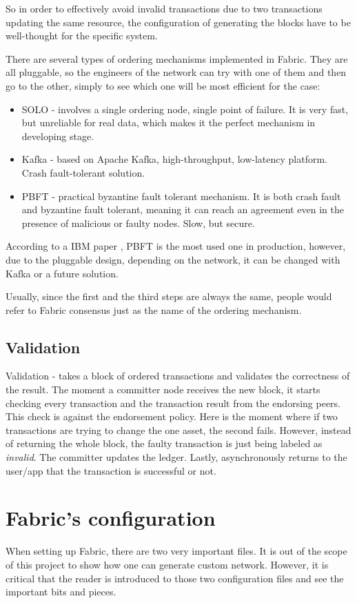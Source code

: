 \documentclass[a4paper,11pt]{report}
\begin{document}
	So in order to effectively avoid invalid transactions due to two transactions updating the same resource, the configuration of generating the blocks have to be well-thought for the specific system. 
	
There are several types of ordering mechanisms implemented in Fabric. They are all pluggable, so the engineers of the network can try with one of them and then go to the other, simply to see which one will be most efficient for the case: 
\begin{itemize}
\item SOLO - involves a single ordering node, single point of failure. It is very fast, but unreliable for real data, which makes it the perfect mechanism in developing stage. 
\item Kafka - based on Apache Kafka, high-throughput, low-latency platform. Crash fault-tolerant solution. 
\item PBFT - practical byzantine fault tolerant mechanism. It is both crash fault and byzantine fault tolerant, meaning it can reach an agreement even in the presence of malicious or faulty nodes. Slow, but secure.
\end{itemize}
According to a IBM paper \cite{cachin2016architecture}, PBFT is the most used one in production, however, due to the pluggable design, depending on the network, it can be changed with Kafka or a future solution.

Usually, since the first and the third steps are always the same, people would refer to Fabric consensus just as the name of the ordering mechanism.

\subsection{Validation}

Validation - takes a block of ordered transactions and validates the correctness of the result. 
	The moment a committer node receives the new block, it starts checking every transaction and the transaction result from the endorsing peers. This check is against the endorsement policy. Here is the moment where if two transactions are trying to change the one asset, the second fails. However, instead of returning the whole block, the faulty transaction is just being labeled as \textit{invalid}. The committer updates the ledger. Lastly, asynchronously returns to the user/app that the transaction is successful or not. 

\section{Fabric's configuration}
When setting up Fabric, there are two very important files. It is out of the scope of this project to show how one can generate custom network. However, it is critical that the reader is introduced to those two configuration files and see the important bits and pieces. 
\end{document}

